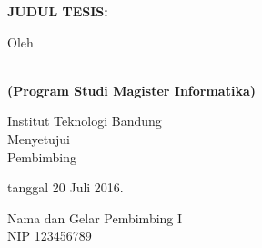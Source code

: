 \clearpage
\pagestyle{empty}

\begin{center}
\smallskip

	\begin{spacing}{1}
    	\Large \bfseries \MakeUppercase{Judul Tesis: \thetitle}
    \end{spacing}
    \vfill

    \large Oleh \\
    \begin{spacing}{1}
		\bfseries \Large \theauthor \\
		(Program Studi Magister Informatika)  
    \end{spacing}

    \large Institut Teknologi Bandung \\

    \vfill
    \normalsize \normalfont
    Menyetujui \\
    Pembimbing
    
    tanggal 20 Juli 2016.

    \vfill
    
    Nama dan Gelar Pembimbing I \\
    NIP 123456789

\end{center}
\clearpage
